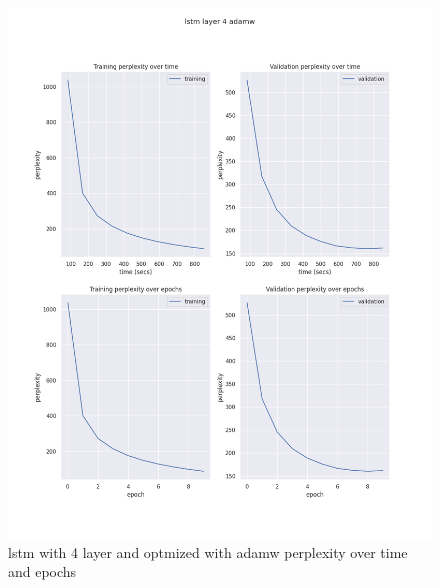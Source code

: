 \documentclass[12pt]{article}
\theoremstyle{definition}
\begin{document}
\begin{figure}[H]
     \centering
     \includegraphics[scale=0.4]{lstm_layer_4_adamw.png}
     \caption{lstm with 4 layer and optmized with adamw perplexity over time and epochs}
\end{figure}
\end{document}

